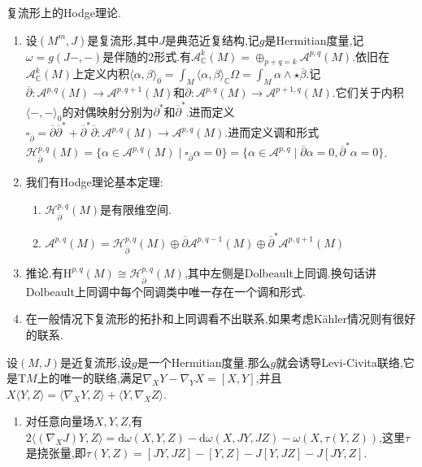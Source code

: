 复流形上的Hodge理论.
\begin{enumerate}
	\item 设$(M^m,J)$是复流形,其中$J$是典范近复结构,记$g$是Hermitian度量,记$\omega=g(J-,-)$是伴随的2形式.有$\mathscr{A}_{\mathbb{C}}^k(M)=\oplus_{p+q=k}\mathscr{A}^{p,q}(M)$.依旧在$\mathscr{A}_{\mathbb{C}}^k(M)$上定义内积$\langle\alpha,\beta\rangle_0=\int_M\langle\alpha,\beta\rangle_{\mathbb{C}}\Omega=\int_M\alpha\wedge\star\overline{\beta}$.记$\overline{\partial}:\mathscr{A}^{p,q}(M)\to\mathscr{A}^{p,q+1}(M)$和$\partial:\mathscr{A}^{p,q}(M)\to\mathscr{A}^{p+1,q}(M)$.它们关于内积$\langle-,-\rangle_0$的对偶映射分别为$\partial^*$和$\overline{\partial}^*$.进而定义$\square_{\overline{\partial}}=\overline{\partial}\overline{\partial}^*+\overline{\partial}^*\overline{\partial}:\mathscr{A}^{p,q}(M)\to\mathscr{A}^{p,q}(M)$.进而定义调和形式$\mathscr{H}^{p,q}_{\overline{\partial}}(M)=\{\alpha\in\mathscr{A}^{p,q}(M)\mid\square_{\overline{\partial}}\alpha=0\}=\{\alpha\in\mathscr{A}^{p,q}\mid\overline{\partial}\alpha=0,\overline{\partial}^*\alpha=0\}$.
	\item 我们有Hodge理论基本定理:
	\begin{enumerate}
		\item $\mathscr{H}_{\overline{\partial}}^{p,q}(M)$是有限维空间.
		\item $\mathscr{A}^{p,q}(M)=\mathscr{H}_{\overline{\partial}}^{p,q}(M)\oplus\overline{\partial}\mathscr{A}^{p,q-1}(M)\oplus\overline{\partial}^*\mathscr{A}^{p,q+1}(M)$
	\end{enumerate}
    \item 推论.有$\mathrm{H}^{p,q}(M)\cong\mathscr{H}_{\overline{\partial}}^{p,q}(M)$,其中左侧是Dolbeault上同调.换句话讲Dolbeault上同调中每个同调类中唯一存在一个调和形式.
    \item 在一般情况下复流形的拓扑和上同调看不出联系,如果考虑K\"ahler情况则有很好的联系.
\end{enumerate}

设$(M,J)$是近复流形,设$g$是一个Hermitian度量.那么$g$就会诱导Levi-Civita联络,它是$\mathrm{T}M$上的唯一的联络,满足$\nabla_XY-\nabla_YX=[X,Y]$,并且$X\langle Y,Z\rangle=\langle\nabla_XY,Z\rangle+\langle Y,\nabla_XZ\rangle$.
\begin{enumerate}
	\item 对任意向量场$X,Y,Z$,有$2\langle(\nabla_XJ)Y,Z\rangle=\mathrm{d}\omega(X,Y,Z)-\mathrm{d}\omega(X,JY,JZ)-\omega(X,\tau(Y,Z))$,这里$\tau$是挠张量,即$\tau(Y,Z)=[JY,JZ]-[Y,Z]-J[Y,JZ]-J[JY,Z]$.
\end{enumerate}




















